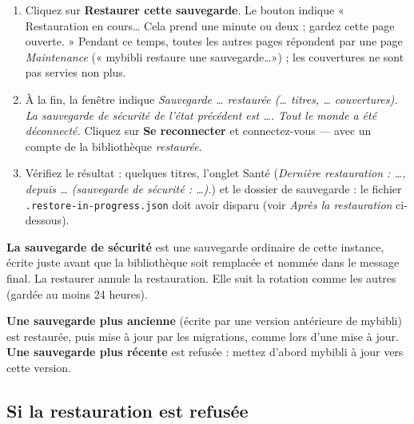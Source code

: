 \begin{enumerate}
        ensuite. Une sauvegarde d'une autre instance, ou d'une version
        plus ancienne, ajoute chacune une ligne (voir plus bas).
  \item Cliquez sur \textbf{Restaurer cette sauvegarde}. Le bouton
        indique « Restauration en cours… Cela prend une minute ou deux ;
        gardez cette page ouverte. » Pendant ce temps, toutes les autres
        pages répondent par une page \emph{Maintenance} (« mybibli
        restaure une sauvegarde\dots ») ; les couvertures ne sont pas
        servies non plus.
  \item À la fin, la fenêtre indique \emph{Sauvegarde \dots{} restaurée
        (\dots{} titres, \dots{} couvertures). La sauvegarde de sécurité
        de l'état précédent est \dots. Tout le monde a été déconnecté.}
        Cliquez sur \textbf{Se reconnecter} et connectez-vous --- avec
        un compte de la bibliothèque \emph{restaurée}.
  \item Vérifiez le résultat : quelques titres, l'onglet Santé
        (\emph{Dernière restauration : \dots, depuis \dots{} (sauvegarde
        de sécurité : \dots).}) et le dossier de sauvegarde : le fichier
        \texttt{.restore-\allowbreak in-\allowbreak progress.json} doit avoir disparu (voir
        \emph{Après la restauration} ci-dessous).
\end{enumerate}

\textbf{La sauvegarde de sécurité} est une sauvegarde ordinaire de cette
instance, écrite juste avant que la bibliothèque soit remplacée et
nommée dans le message final. La restaurer annule la restauration. Elle
suit la rotation comme les autres (gardée au moins 24 heures).

\textbf{Une sauvegarde plus ancienne} (écrite par une version antérieure
de mybibli) est restaurée, puis mise à jour par les migrations, comme
lors d'une mise à jour. \textbf{Une sauvegarde plus récente} est
refusée : mettez d'abord mybibli à jour vers cette version.

\subsection*{Si la restauration est refusée}

